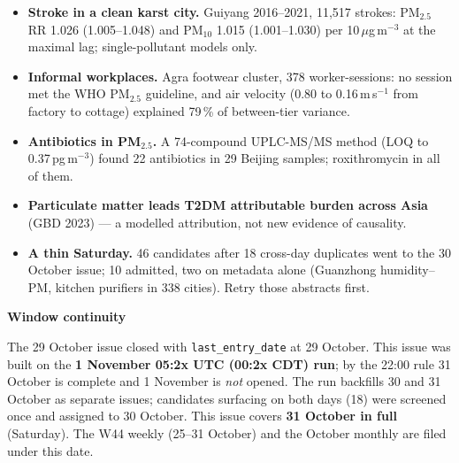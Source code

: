 \documentclass[10pt]{article}
\begin{document}
\footnotesize
\begin{itemize}

\item \textbf{Stroke in a clean karst city.} Guiyang 2016--2021, 11,517 strokes: PM$_{2.5}$ RR 1.026 (1.005--1.048) and
PM$_{10}$ 1.015 (1.001--1.030) per 10\,$\mu$g\,m$^{-3}$ at the maximal lag; single-pollutant models only.

\item \textbf{Informal workplaces.} Agra footwear cluster, 378 worker-sessions: no session met the WHO PM$_{2.5}$
guideline, and air velocity (0.80 to 0.16\,m\,s$^{-1}$ from factory to cottage) explained 79\,\% of between-tier variance.

\item \textbf{Antibiotics in PM$_{2.5}$.} A 74-compound UPLC-MS/MS method (LOQ to 0.37\,pg\,m$^{-3}$) found 22 antibiotics
in 29 Beijing samples; roxithromycin in all of them.

\item \textbf{Particulate matter leads T2DM attributable burden across Asia} (GBD 2023) --- a modelled attribution, not
new evidence of causality.

\item \textbf{A thin Saturday.} 46 candidates after 18 cross-day duplicates went to the 30 October issue; 10 admitted, two on
metadata alone (Guanzhong humidity--PM, kitchen purifiers in 338 cities). Retry those abstracts first.

\end{itemize}

\vspace{2mm}

\begin{keybox}
{\sffamily\bfseries\footnotesize\color{Deep}Window continuity}\\[1.2mm]
{\fontsize{7.2}{8.8}\selectfont
The 29 October issue closed with \texttt{last\_entry\_date} at 29 October. This issue was built on the
\textbf{1 November 05:2x UTC (00:2x CDT) run}; by the 22:00 rule 31 October is complete and 1 November is \emph{not}
opened. The run backfills 30 and 31 October as separate issues; candidates surfacing on both days (18) were screened
once and assigned to 30 October. This issue covers \textbf{31 October in full} (Saturday). The W44 weekly (25--31
October) and the October monthly are filed under this date.\par}
\end{keybox}

\vspace{3mm}
\par{}\baselineskip{}\baselineskip
\end{document}
